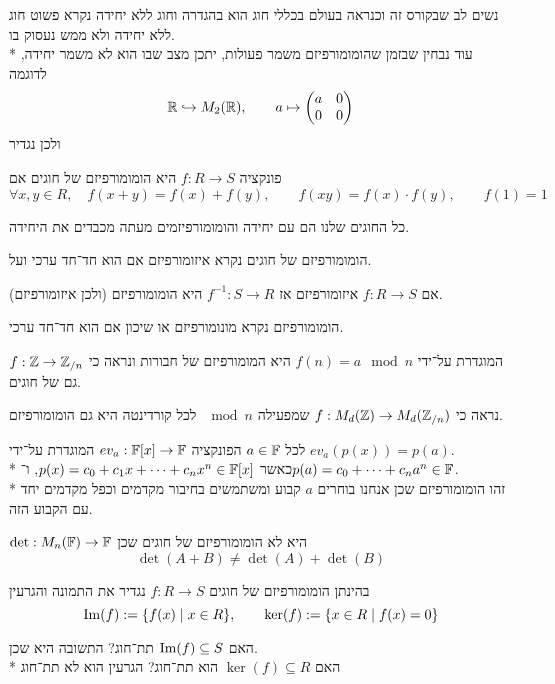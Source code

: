 נשים לב שבקורס זה וכנראה בעולם בכללי חוג הוא בהגדרה וחוג ללא יחידה נקרא פשוט חוג ללא יחידה ולא ממש נעסוק בו. \\*
עוד נבחין שבזמן שהומומורפיזם משמר פעולות, יתכן מצב שבו הוא לא משמר יחידה, לדוגמה
\[
	\mathbb{R} \hookrightarrow M_2(\mathbb{R}),
	\qquad
	a \mapsto \begin{pmatrix}
		a & 0 \\
		0 & 0
	\end{pmatrix}
\]
ולכן נגדיר
\begin{definition}
	פונקציה $f : R \to S$ היא הומומורפיזם של חוגים אם
	\[
		\forall x, y \in R,
		\quad
		f(x + y) = f(x) + f(y),
		\qquad
		f(x y) = f(x) \cdot f(y),
		\qquad
		f(1) = 1
	\]
\end{definition}
כל החוגים שלנו הם עם יחידה והומומורפיזמים מעתה מכבדים את היחידה.
\begin{definition}[איזומורפיזם]
	הומומורפיזם של חוגים נקרא איזומורפיזם אם הוא חד־חד ערכי ועל.
\end{definition}
\begin{lemma}
	אם $f : R \to S$ איזומורפיזם אז $f^{-1} : S \to R$ היא הומומורפיזם (ולכן איזומורפיזם).
\end{lemma}
\begin{definition}[שיכון]
	הומומורפיזם נקרא מונומורפיזם או שיכון אם הוא חד־חד ערכי.
\end{definition}
\begin{example}
	$f : \mathbb{Z} \to \mathbb{Z}_{/n}$ המוגדרת על־ידי $f(n) = a \mod n$ היא המומורפיזם של חבורות ונראה כי גם של חוגים.
\end{example}
\begin{example}
	נראה כי $f : M_d(\mathbb{Z}) \to M_d(\mathbb{Z}_{/n})$ שמפעילה $\mod n$ לכל קורדינטה היא גם הומומורפיזם.
\end{example}
\begin{example}
	לכל $a \in \mathbb{F}$ הפונקציה $ev_a : \mathbb{F}[x] \to \mathbb{F}$ המוגדרת על־ידי $ev_a(p(x)) = p(a)$. \\*
	כאשר $p(x) = c_0 + c_1 x + \cdots + c_n x^n \in \mathbb{F}[x]$, ו־$p(a) = c_0 + \cdots + c_n a^n \in \mathbb{F}$. \\*
	זהו הומומורפיזם שכן אנחנו בוחרים $a$ קבוע ומשתמשים בחיבור מקדמים וכפל מקדמים יחד עם הקבוע הזה.
\end{example}
\begin{example}
	$\det : M_n(\mathbb{F}) \to \mathbb{F}$ היא לא הומומורפיזם של חוגים שכן
	\[
		\det(A + B) \ne \det(A) + \det(B)
	\]
\end{example}
\begin{definition}
	בהינתן הומומורפיזם של חוגים $f : R \to S$ נגדיר את התמונה והגרעין
	\[
		\operatorname{Im}(f) := \{ f(x) \mid x \in R \},
		\qquad
		\ker(f) := \{ x \in R \mid f(x) = 0 \}
	\]
\end{definition}
\begin{remark}
	האם $\operatorname{Im}(f) \subseteq S$ תת־חוג? התשובה היא שכן. \\*
	האם $\ker(f) \subseteq R$ הוא תת־חוג? הגרעין הוא לא תת־חוג
\end{remark}

